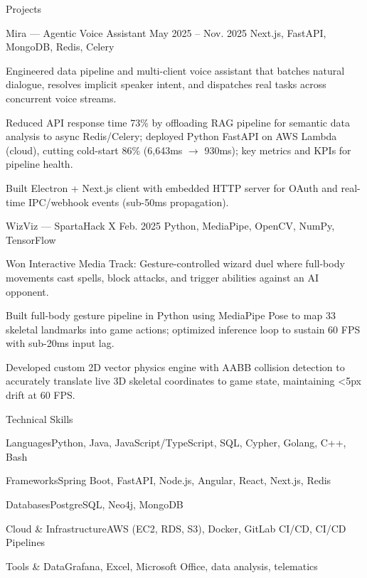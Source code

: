 \documentclass[
	11pt
]{../../../resume}
\begin{document}
	\begin{rSection}{P}{rojects}
		\begin{rSectionEntry}
			{Mira --- Agentic Voice Assistant}
			{May 2025 -- Nov. 2025}
			{}
			{Next.js, FastAPI, MongoDB, Redis, Celery}
			{}

			\item Engineered data pipeline and multi-client voice assistant that batches natural dialogue, resolves implicit speaker intent, and dispatches real tasks across concurrent voice streams.
			\item Reduced API response time 73\% by offloading RAG pipeline for semantic data analysis to async Redis/Celery; deployed Python FastAPI on AWS Lambda (cloud), cutting cold-start 86\% (6{,}643ms $\rightarrow$ 930ms); key metrics and KPIs for pipeline health.
			\item Built Electron + Next.js client with embedded HTTP server for OAuth and real-time IPC/webhook events (sub-50ms propagation).
		\end{rSectionEntry}

		\begin{rSectionEntry}
			{WizViz --- SpartaHack X}
			{Feb. 2025}
			{}
			{Python, MediaPipe, OpenCV, NumPy, TensorFlow}
			{}

			\item Won Interactive Media Track: Gesture-controlled wizard duel where full-body movements cast spells, block attacks, and trigger abilities against an AI opponent.
			\item Built full-body gesture pipeline in Python using MediaPipe Pose to map 33 skeletal landmarks into game actions; optimized inference loop to sustain 60 FPS with sub-20ms input lag.
			\item Developed custom 2D vector physics engine with AABB collision detection to accurately translate live 3D skeletal coordinates to game state, maintaining \textless5px drift at 60 FPS.
		\end{rSectionEntry}
	\end{rSection}

	\begin{rSection}{T}{echnical Skills}
		\begin{rSet}{Languages}{Python, Java, JavaScript/TypeScript, SQL, Cypher, Golang, C++, Bash}
		\end{rSet}
		\begin{rSet}{Frameworks}{Spring Boot, FastAPI, Node.js, Angular, React, Next.js, Redis}
		\end{rSet}
		\begin{rSet}{Databases}{PostgreSQL, Neo4j, MongoDB}
		\end{rSet}
		\begin{rSet}{Cloud \& Infrastructure}{AWS (EC2, RDS, S3), Docker, GitLab CI/CD, CI/CD Pipelines}
		\end{rSet}
		\begin{rSet}{Tools \& Data}{Grafana, Excel, Microsoft Office, data analysis, telematics}
		\end{rSet}
	\end{rSection}
\end{document}
